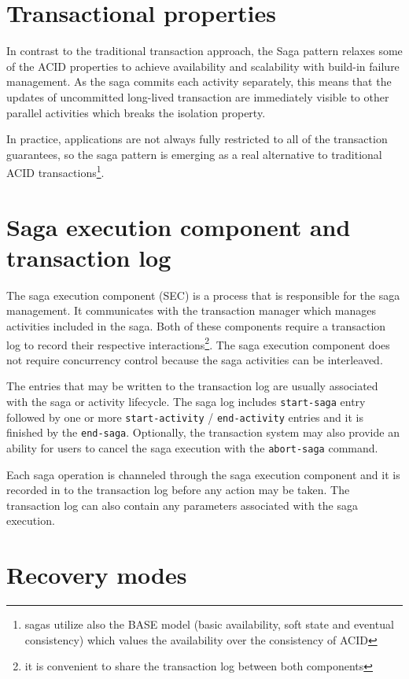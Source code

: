 \documentclass[oneside,
  digital, %
  table,   %
  nolof,     %
  nolot,     %
]{fithesis3}
\begin{document}
\section{Transactional properties}

In contrast to the traditional transaction approach, the Saga pattern relaxes some of the ACID properties to achieve availability and scalability with build-in failure management. As the saga commits each activity separately, this means that the updates of uncommitted long-lived transaction are immediately visible to other parallel activities \cite{trans_concept} which breaks the isolation property.

In practice, applications are not always fully restricted to all of the transaction guarantees, so the saga pattern is emerging as a real alternative to traditional ACID transactions\footnote{sagas utilize also the BASE model (basic availability, soft state and eventual consistency) which values the availability over the consistency of ACID}.

\section{Saga execution component and transaction log}

The saga execution component (SEC) is a process that is responsible for the saga management. It communicates with the transaction manager which manages activities included in the saga. Both of these components require a transaction log to record their respective interactions\footnote{it is convenient to share the transaction log between both components}. The saga execution component does not require  concurrency control because the saga activities can be interleaved.

The entries that may be written to the transaction log are usually associated with the saga or activity lifecycle. The saga log includes \texttt{start-saga} entry followed by one or more \texttt{start-activity} / \texttt{end-activity} entries and it is finished by the \texttt{end-saga}. Optionally, the transaction system may also provide an ability for users to cancel the saga execution with the \texttt{abort-saga} command. 

Each saga operation is channeled through the saga execution component and it is recorded in to the transaction log before any action may be taken. The transaction log can also contain any parameters associated with the saga execution.

\section{Recovery modes}
\label{sec:recovery-modes}
\end{document}
